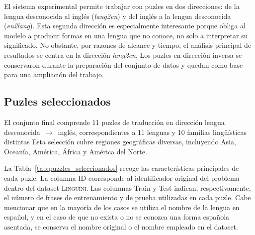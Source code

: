 El sistema experimental permite trabajar con puzles en dos direcciones: de la lengua desconocida al inglés (\textit{lang2en}) y del inglés a la lengua desconocida (\textit{en2lang}). Esta segunda dirección es especialmente interesante porque obliga al modelo a producir formas en una lengua que no conoce, no solo a interpretar su significado. No obstante, por razones de alcance y tiempo, el análisis principal de resultados se centra en la dirección \textit{lang2en}. Los puzles en dirección inversa se conservaron durante la preparación del conjunto de datos y quedan como base para una ampliación del trabajo.

\subsection{Puzles seleccionados}

El conjunto final comprende 11 puzles de traducción en dirección lengua desconocida~$\rightarrow$~inglés, correspondientes a 11 lenguas y 10 familias lingüísticas distintas Esta selección cubre regiones geográficas diversas, incluyendo Asia, Oceanía, América, África y América del Norte.

La Tabla~\ref{tab:puzzles_seleccionados} recoge las características principales de cada puzle. La columna ID corresponde al identificador original del problema dentro del dataset \textsc{Linguini}. Las columnas Train y Test indican, respectivamente, el número de frases de entrenamiento y de prueba utilizadas en cada puzle. Cabe mencionar que en la mayoría de los casos se utiliza el nombre de la lengua en español, y en el caso de que no exista o no se conozca una forma española asentada, se conserva el nombre original o el nombre empleado en el dataset.

